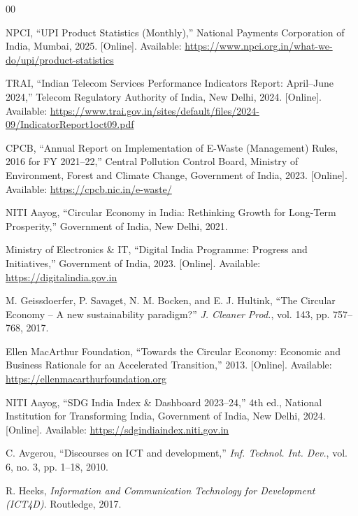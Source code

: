 \documentclass[conference]{IEEEtran}
\begin{document}
\balance
\begin{thebibliography}{00}

NPCI, ``UPI Product Statistics (Monthly),'' National Payments Corporation of India, Mumbai, 2025. [Online]. Available: \url{https://www.npci.org.in/what-we-do/upi/product-statistics}

TRAI, ``Indian Telecom Services Performance Indicators Report: April--June 2024,'' Telecom Regulatory Authority of India, New Delhi, 2024. [Online]. Available: \url{https://www.trai.gov.in/sites/default/files/2024-09/IndicatorReport1oct09.pdf}

CPCB, ``Annual Report on Implementation of E-Waste (Management) Rules, 2016 for FY 2021--22,'' Central Pollution Control Board, Ministry of Environment, Forest and Climate Change, Government of India, 2023. [Online]. Available: \url{https://cpcb.nic.in/e-waste/}

NITI Aayog, ``Circular Economy in India: Rethinking Growth for Long-Term Prosperity,'' Government of India, New Delhi, 2021.

Ministry of Electronics \& IT, ``Digital India Programme: Progress and Initiatives,'' Government of India, 2023. [Online]. Available: \url{https://digitalindia.gov.in}

M. Geissdoerfer, P. Savaget, N. M. Bocken, and E. J. Hultink, ``The Circular Economy -- A new sustainability paradigm?'' \textit{J. Cleaner Prod.}, vol. 143, pp. 757--768, 2017.

Ellen MacArthur Foundation, ``Towards the Circular Economy: Economic and Business Rationale for an Accelerated Transition,'' 2013. [Online]. Available: \url{https://ellenmacarthurfoundation.org}

NITI Aayog, ``SDG India Index \& Dashboard 2023--24,'' 4th ed., National Institution for Transforming India, Government of India, New Delhi, 2024. [Online]. Available: \url{https://sdgindiaindex.niti.gov.in}

C. Avgerou, ``Discourses on ICT and development,'' \textit{Inf. Technol. Int. Dev.}, vol. 6, no. 3, pp. 1--18, 2010.

R. Heeks, \textit{Information and Communication Technology for Development (ICT4D)}. Routledge, 2017.


\end{thebibliography}
\end{document}
